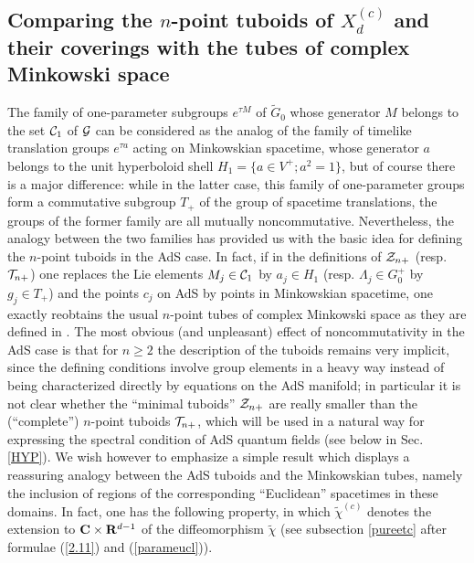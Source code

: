 \documentclass[a4paper,a4paper]{article}
\def\CC{{\cal C}}
\def\TT{{\cal T}}
\def\ZZ{{\cal Z}}
\def\wt{\widetilde}
\begin{document}
\subsection{Comparing the $n$-point tuboids of $X_d^{(c)}$
and their coverings with the tubes of complex Minkowski space}
\label{Comptub}
The family of one-parameter subgroups $e^{\tau M}$ of $\wt G_0$
whose generator $M$ belongs to the set $\CC_1$ of $\cal G$
can be considered as the analog of the family of timelike
translation groups $e^{\tau a}$ acting on Minkowskian spacetime,
whose generator $a$ belongs to the unit hyperboloid shell
$H_1 =\{a\in V^+; a^2=1 \}$, but of course there is a major difference:
while in the latter case, this family of one-parameter groups form
a commutative subgroup $T_+$ of the group of spacetime translations,
the groups of the former family are all mutually noncommutative.
Nevertheless, the analogy between the two families has provided us
with the basic idea for defining the $n$-point tuboids in the AdS case.
In fact, if in the definitions of $\ZZ_{n+}$ (resp. $\TT_{n+}$)
one replaces the Lie elements $M_j \in \CC_1$ by $a_j \in H_1$ (resp.
$\Lambda_j \in G_0^+$ by $g_j \in T_+$) and the points $c_j$ on AdS by
points in Minkowskian spacetime, one exactly reobtains the usual
$n$-point tubes of complex Minkowski space as they are defined in
\cite{SW}. The most obvious (and unpleasant) effect of noncommutativity
in the AdS case is that for $n \ge 2$ the description of the
tuboids remains very implicit, since  the defining conditions
involve group elements in a heavy way
instead of being characterized directly by equations on the
AdS manifold; in particular it is not clear whether the ``minimal
tuboids'' $\ZZ_{n+}$ are really smaller than the (``complete'')
$n$-point tuboids $\TT_{n+}$, which will be used
in a natural way for expressing
the spectral condition of AdS quantum fields
(see below in Sec. \ref{HYP}).
We wish however to emphasize a simple result which displays
a reassuring analogy between the AdS tuboids and the Minkowskian
tubes, namely the inclusion of regions of the
corresponding ``Euclidean'' spacetimes in these domains. In
fact, one has
the following property, in which $\wt \chi^{(c)}$
denotes the extension to ${\bf C} \times {\bf R}^{d-1}$ of
the diffeomorphism $\wt \chi$ (see subsection \ref{pureetc}
after formulae (\ref{2.11}) and (\ref{parameucl})).
\end{document}
